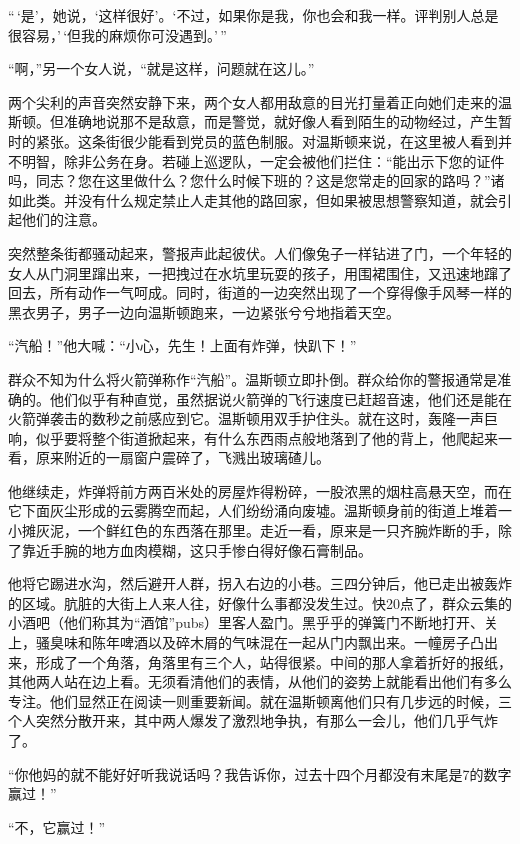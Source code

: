``\,`是'，她说，`这样很好'。`不过，如果你是我，你也会和我一样。评判别人总是很容易，'\,`但我的麻烦你可没遇到。'\,''

``啊，''另一个女人说，``就是这样，问题就在这儿。''

两个尖利的声音突然安静下来，两个女人都用敌意的目光打量着正向她们走来的温斯顿。但准确地说那不是敌意，而是警觉，就好像人看到陌生的动物经过，产生暂时的紧张。这条街很少能看到党员的蓝色制服。对温斯顿来说，在这里被人看到并不明智，除非公务在身。若碰上巡逻队，一定会被他们拦住：``能出示下您的证件吗，同志？您在这里做什么？您什么时候下班的？这是您常走的回家的路吗？''诸如此类。并没有什么规定禁止人走其他的路回家，但如果被思想警察知道，就会引起他们的注意。

突然整条街都骚动起来，警报声此起彼伏。人们像兔子一样钻进了门，一个年轻的女人从门洞里蹿出来，一把拽过在水坑里玩耍的孩子，用围裙围住，又迅速地蹿了回去，所有动作一气呵成。同时，街道的一边突然出现了一个穿得像手风琴一样的黑衣男子，男子一边向温斯顿跑来，一边紧张兮兮地指着天空。

``汽船！''他大喊：``小心，先生！上面有炸弹，快趴下！''

群众不知为什么将火箭弹称作``汽船''。温斯顿立即扑倒。群众给你的警报通常是准确的。他们似乎有种直觉，虽然据说火箭弹的飞行速度已赶超音速，他们还是能在火箭弹袭击的数秒之前感应到它。温斯顿用双手护住头。就在这时，轰隆一声巨响，似乎要将整个街道掀起来，有什么东西雨点般地落到了他的背上，他爬起来一看，原来附近的一扇窗户震碎了，飞溅出玻璃碴儿。

他继续走，炸弹将前方两百米处的房屋炸得粉碎，一股浓黑的烟柱高悬天空，而在它下面灰尘形成的云雾腾空而起，人们纷纷涌向废墟。温斯顿身前的街道上堆着一小摊灰泥，一个鲜红色的东西落在那里。走近一看，原来是一只齐腕炸断的手，除了靠近手腕的地方血肉模糊，这只手惨白得好像石膏制品。

他将它踢进水沟，然后避开人群，拐入右边的小巷。三四分钟后，他已走出被轰炸的区域。肮脏的大街上人来人往，好像什么事都没发生过。快20点了，群众云集的小酒吧（他们称其为``酒馆''pubs）里客人盈门。黑乎乎的弹簧门不断地打开、关上，骚臭味和陈年啤酒以及碎木屑的气味混在一起从门内飘出来。一幢房子凸出来，形成了一个角落，角落里有三个人，站得很紧。中间的那人拿着折好的报纸，其他两人站在边上看。无须看清他们的表情，从他们的姿势上就能看出他们有多么专注。他们显然正在阅读一则重要新闻。就在温斯顿离他们只有几步远的时候，三个人突然分散开来，其中两人爆发了激烈地争执，有那么一会儿，他们几乎气炸了。

``你他妈的就不能好好听我说话吗？我告诉你，过去十四个月都没有末尾是7的数字赢过！''

``不，它赢过！''

